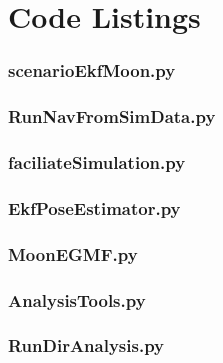 \documentclass[conf]{new-aiaa}
\begin{document}
\newpage
\appendix
\section{Code Listings}
\label{Appendix:A}

\subsubsection{scenarioEkfMoon.py}


\subsubsection{RunNavFromSimData.py}


\subsubsection{faciliateSimulation.py}


\subsubsection{EkfPoseEstimator.py}


\subsubsection{MoonEGMF.py}



\subsubsection{AnalysisTools.py}


\subsubsection{RunDirAnalysis.py}

\end{document}
